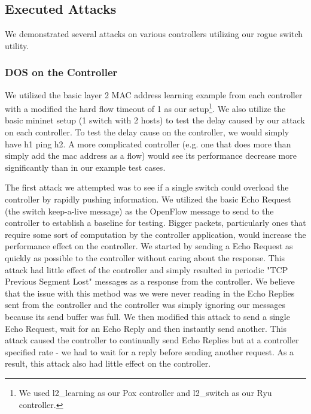 
\subsection{Executed Attacks} 

We demonstrated several attacks on various controllers utilizing our rogue switch utility. 

\subsubsection{DOS on the Controller}
We utilized the basic layer 2 MAC address learning example from each controller with a modified the hard flow timeout of 1 as our setup\footnote{We used l2\_learning as our Pox controller and l2\_switch as our Ryu controller.}. We also utilize the basic mininet setup (1 switch with 2 hosts) to test the delay caused by our attack on each controller. To test the delay cause on the controller, we would simply have h1 ping h2. A more complicated controller (e.g. one that does more than simply add the mac address as a flow) would see its performance decrease more significantly than in our example test cases.

 The first attack we attempted was to see if a single switch could overload the controller by rapidly pushing information. We utilized the basic Echo Request (the switch keep-a-live message) as the OpenFlow message to send to the controller to establish a baseline for testing. Bigger packets, particularly ones that require some sort of computation by the controller application, would increase the performance effect on the controller. We started by sending a Echo Request as quickly as possible to the controller without caring about the response. This attack had little effect of the controller and simply resulted in periodic "TCP Previous Segment Lost" messages as a response from the controller. We believe that the issue with this method was we were never reading in the Echo Replies sent from the controller and the controller was simply ignoring our messages because its send buffer was full. We then modified this attack to send a single Echo Request, wait for an Echo Reply and then instantly send another. This attack caused the controller to continually send Echo Replies but at a controller specified rate - we had to wait for a reply before sending another request. As a result, this attack also had little effect on the controller.

